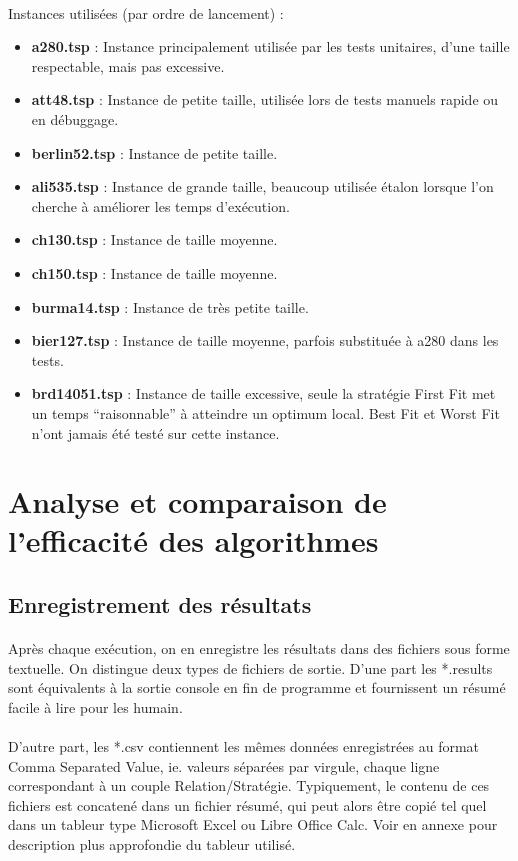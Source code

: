 \documentclass[a4paper,10pt]{report}
\begin{document}
\paragraph{}
Instances utilisées (par ordre de lancement) :
\begin{itemize}
  \item \textbf{a280.tsp} : Instance principalement utilisée par les tests
unitaires, d'une taille respectable, mais pas excessive.
  \item \textbf{att48.tsp} : Instance de petite taille, utilisée lors de tests
manuels rapide ou en débuggage.
  \item \textbf{berlin52.tsp} : Instance de petite taille.
  \item \textbf{ali535.tsp} : Instance de grande taille, beaucoup utilisée
étalon lorsque l'on cherche à améliorer les temps
d'exécution.
  \item \textbf{ch130.tsp} : Instance de taille moyenne.
  \item \textbf{ch150.tsp} : Instance de taille moyenne.
  \item \textbf{burma14.tsp} : Instance de très petite taille.
  \item \textbf{bier127.tsp} : Instance de taille moyenne, parfois substituée à
a280 dans les tests.
  \item \textbf{brd14051.tsp} : Instance de taille excessive, seule la stratégie
First Fit met un temps ``raisonnable''
à atteindre un optimum local. Best Fit et Worst Fit n'ont jamais été testé sur
cette instance.
\end{itemize}

\pagebreak
\section{Analyse et comparaison de l'efficacité des algorithmes}
\subsection{Enregistrement des résultats}

\paragraph{}
  Après chaque exécution, on en enregistre les résultats dans des fichiers sous
forme textuelle. On distingue deux types de fichiers de sortie. D'une part les
*.results sont équivalents à la sortie console en fin de programme et
fournissent un résumé facile à lire pour les humain.
\paragraph{}
  D'autre part, les *.csv contiennent les mêmes données enregistrées au format
Comma Separated Value, ie. valeurs séparées par virgule, chaque ligne
correspondant à un couple Relation/Stratégie. Typiquement, le contenu de ces 
fichiers est concatené dans un fichier résumé, qui peut alors être copié tel
quel dans un tableur type Microsoft Excel ou Libre Office Calc. Voir en annexe
pour description plus approfondie du tableur utilisé.
\end{document}
